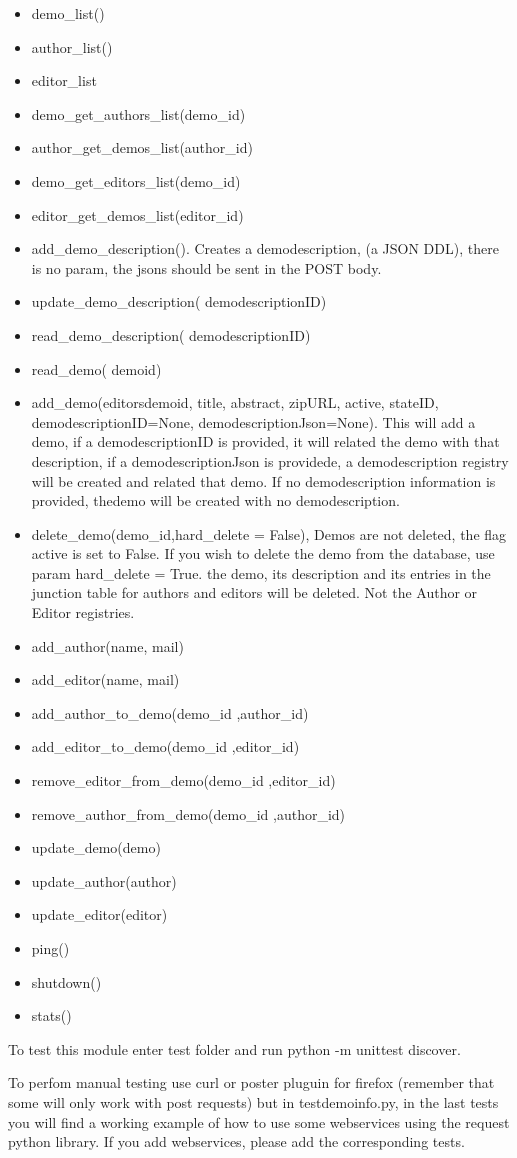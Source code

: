 \begin{itemize}
\item demo\_list()
\item author\_list()
\item editor\_list 
\item demo\_get\_authors\_list(demo\_id)
\item author\_get\_demos\_list(author\_id)
\item demo\_get\_editors\_list(demo\_id)
\item editor\_get\_demos\_list(editor\_id)
\item add\_demo\_description(). Creates a demodescription, (a JSON DDL), there is no param, the jsons should be sent in the POST body.
\item update\_demo\_description( demodescriptionID)
\item read\_demo\_description( demodescriptionID)
\item read\_demo( demoid)
\item add\_demo(editorsdemoid, title, abstract, zipURL, active, stateID, demodescriptionID=None, demodescriptionJson=None). This will add a demo, if a demodescriptionID is provided, it will related the demo with that description, if a demodescriptionJson is providede, a demodescription registry will be created and related that demo. If no demodescription information is provided, thedemo will be created with no demodescription.
\item delete\_demo(demo\_id,hard\_delete = False), Demos are not deleted, the flag active is set to False. If you wish to delete the demo from the database, use param hard\_delete = True. the demo, its description and its entries in the junction table for authors and editors will be deleted. Not the Author or Editor registries.
\item add\_author(name, mail)
\item add\_editor(name, mail)
\item add\_author\_to\_demo(demo\_id ,author\_id)
\item add\_editor\_to\_demo(demo\_id ,editor\_id)
\item remove\_editor\_from\_demo(demo\_id ,editor\_id)
\item remove\_author\_from\_demo(demo\_id ,author\_id)
\item update\_demo(demo)
\item update\_author(author)
\item update\_editor(editor)
\item ping()
\item shutdown()
\item stats()
\end{itemize}


To test this module enter test folder and run python -m unittest discover.

To perfom manual testing use curl or poster pluguin for firefox (remember that some will only work with post requests) but in testdemoinfo.py, in the last tests you will find a working example of how to use some webservices using the request python library.
If you add webservices, please add the corresponding tests.